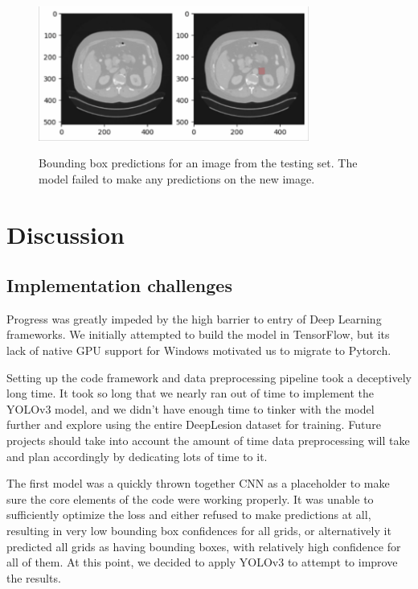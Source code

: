 \begin{figure}
 \begin{center}
 \includegraphics[width=3.5in]{images/testing performance.png}\\
 \caption{Bounding box predictions for an image from the testing set. The model failed to make any predictions on the new image.}\label{fig:testing}
 \end{center}
\end{figure}

\section{Discussion}
\subsection{Implementation challenges}
Progress was greatly impeded by the high barrier to entry of Deep Learning frameworks. We initially attempted to build the model in TensorFlow, but its lack of native GPU support for Windows motivated us to migrate to Pytorch. 

Setting up the code framework and data preprocessing pipeline took a deceptively long time. It took so long that we nearly ran out of time to implement the YOLOv3 model, and we didn't have enough time to tinker with the model further and explore using the entire DeepLesion dataset for training. Future projects should take into account the amount of time data preprocessing will take and plan accordingly by dedicating lots of time to it.

The first model was a quickly thrown together CNN as a placeholder to make sure the core elements of the code were working properly. It was unable to sufficiently optimize the loss and either refused to make predictions at all, resulting in very low bounding box confidences for all grids, or alternatively it predicted all grids as having bounding boxes, with relatively high confidence for all of them. At this point, we decided to apply YOLOv3 to attempt to improve the results.

